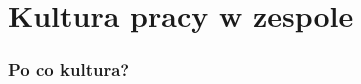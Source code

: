 \section{Kultura pracy w zespole}
\label{kultura}


\begin{frame}
    \frametitle{Po co kultura?}

    

\end{frame}